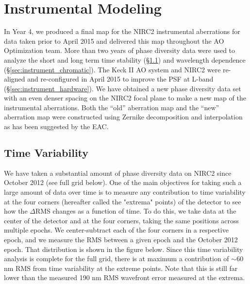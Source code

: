 \section{Instrumental Modeling}
\label{sec:instrument}

In Year 4, we produced a final map for the NIRC2 instrumental
aberrations for data taken prior to April 2015 and delivered this map
throughout the AO Optimization team. More than two years of
phase diversity data were used to analyze the short and long term time
stability (\S\ref{sec:instrument_time}) and wavelength dependence 
(\S\ref{sec:instrument_chromatic}). 
The Keck \textrm{II} AO system and NIRC2 were re-aligned and
re-configured in April 2015 to improve the PSF at L-band
(\S\ref{sec:instrument_hardware}). We have
obtained a new phase diversity data set with an even denser spacing on
the NIRC2 focal plane to make a new map of the instrumental
aberrations.
Both the ``old'' aberration map and the ``new'' aberration map were
constructed using Zernike decomposition and interpolation as has been
suggested by the EAC.

\subsection{Time Variability}
\label{sec:instrument_time}
We have taken a substantial amount of phase diversity data on NIRC2
since October 2012 (see full grid below). One of the main objectives
for taking such a large amount of data over time is to measure any
contribution to time variability at the four corners (hereafter called
the "extrema" points) of the detector to see how the $\Delta$RMS
changes as a function of time. To do this, we take data at the center
of the detector and at the four corners, taking the same positions
across multiple epochs. We center-subtract each of the four corners in
a respective epoch, and we measure the RMS between a given epoch and
the October 2012 epoch. That distribution is shown in the figure
below. Since this time variability analysis is complete for the full grid, there is at maximum a contribution of $\sim$60 nm RMS from time variability at the extreme points. Note that this is still far lower than the measured 190 nm RMS wavefront error measured at the extrema.

    
    
    
    
    
  
  
  